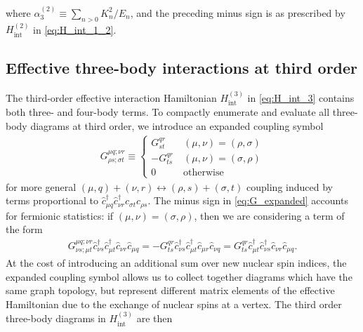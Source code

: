 \documentclass[preprint,showkeys,nofootinbib]{revtex4-1}
\renewcommand{\t}{\text} %
\newcommand{\p}[1]{\left(#1\right)} %
\renewcommand{\c}{\hat{c}}
\newcommand{\1}{\mathds{1}}
\begin{document}
where $\alpha_3^{(2)} \equiv \sum_{n>0} K_n^2/E_n$, and the preceding
minus sign is as prescribed by $H_{\t{int}}^{(2)}$ in
\eqref{eq:H_int_1_2}.

\subsection{Effective three-body interactions at third order}

The third-order effective interaction Hamiltonian $H_{\t{int}}^{(3)}$
in \eqref{eq:H_int_3} contains both three- and four-body terms.  To
compactly enumerate and evaluate all three-body diagrams at third
order, we introduce an expanded coupling symbol
\begin{align}
  G^{\mu q;\nu r}_{\rho s;\sigma t} \equiv \left\{
    \begin{array}{ll}
      G^{qr}_{st} & ~ \p{\mu,\nu} = \p{\rho,\sigma}
      \\
      - G^{qr}_{ts} & ~ \p{\mu,\nu} = \p{\sigma,\rho}
      \\
      0 & ~ \t{otherwise}
    \end{array}\right.
  \label{eq:G_expanded}
\end{align}
for more general
$\p{\mu,q}+\p{\nu,r}\leftrightarrow\p{\rho,s}+\p{\sigma,t}$ coupling
induced by terms proportional to
$\c_{\mu q}^\dag \c_{\nu r}^\dag \c_{\sigma t} \c_{\rho s}$.  The
minus sign in \eqref{eq:G_expanded} accounts for fermionic statistics:
if $\p{\mu,\nu}=\p{\sigma,\rho}$, then we are considering a term of
the form
\begin{align}
  G^{\mu q;\nu r}_{\nu s;\mu t}
  \c_{\nu s}^\dag \c_{\mu t}^\dag \c_{\nu r} \c_{\mu q}
  = -G^{qr}_{ts} \c_{\nu s}^\dag \c_{\mu t}^\dag \c_{\mu r} \c_{\nu q}
  = G^{qr}_{ts} \c_{\mu t}^\dag \c_{\nu s}^\dag \c_{\nu r} \c_{\mu q}.
\end{align}
At the cost of introducing an additional sum over new nuclear spin
indices, the expanded coupling symbol allows us to collect together
diagrams which have the same graph topology, but represent different
matrix elements of the effective Hamiltonian due to the exchange of
nuclear spins at a vertex.  The third order three-body diagrams in
$H_{\t{int}}^{(3)}$ are then
\end{document}
